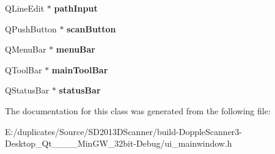 \begin{DoxyCompactItemize}
\item 
\hypertarget{class_ui___main_window_ac01f7b29def5868964d57473a693defe}{Q\-Line\-Edit $\ast$ {\bfseries path\-Input}}\label{class_ui___main_window_ac01f7b29def5868964d57473a693defe}

\item 
\hypertarget{class_ui___main_window_a41ca895e951c2e2f3c09deea57bd34c3}{Q\-Push\-Button $\ast$ {\bfseries scan\-Button}}\label{class_ui___main_window_a41ca895e951c2e2f3c09deea57bd34c3}

\item 
\hypertarget{class_ui___main_window_a502a50d7dc22415f511336bdfb4318b9}{Q\-Menu\-Bar $\ast$ {\bfseries menu\-Bar}}\label{class_ui___main_window_a502a50d7dc22415f511336bdfb4318b9}

\item 
\hypertarget{class_ui___main_window_abca26371605d7c5235fab5188d4bdcf7}{Q\-Tool\-Bar $\ast$ {\bfseries main\-Tool\-Bar}}\label{class_ui___main_window_abca26371605d7c5235fab5188d4bdcf7}

\item 
\hypertarget{class_ui___main_window_afa919f3af6f2f526a70f1fa331f63724}{Q\-Status\-Bar $\ast$ {\bfseries status\-Bar}}\label{class_ui___main_window_afa919f3af6f2f526a70f1fa331f63724}

\end{DoxyCompactItemize}


The documentation for this class was generated from the following file\-:\begin{DoxyCompactItemize}
\item 
E\-:/duplicates/\-Source/\-S\-D2013\-D\-Scanner/build-\/\-Dopple\-Scanner3-\/\-Desktop\-\_\-\-Qt\-\_\-\_\-\_\-\_\-\-Min\-G\-W\-\_\-32bit-\/\-Debug/ui\-\_\-mainwindow.\-h\end{DoxyCompactItemize}
